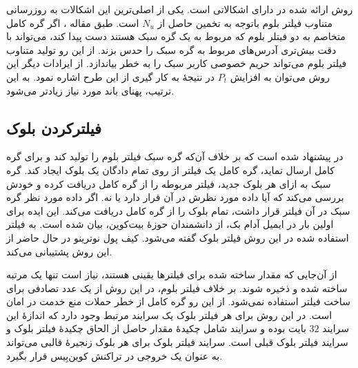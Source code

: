 روش ارائه شده در \cite{Kanemura2017} دارای اشکالاتی است. یکی از اصلی‌ترین این اشکالات به روزرسانی متناوب فیلتر بلوم باتوجه به تخمین حاصل از $N_u$  است. طبق مقاله \cite{Gervais2014}، اگر گره کامل متخاصم به دو فیتلر بلوم که مربوط به یک گره سبک هستند دست پیدا کند، می‌تواند با دقت بیش‌تری آدرس‌های مربوط به گره سبک را حدس بزند. از این رو تولید متناوب فیلتر بلوم می‌تواند حریم خصوصی کاربر سبک را به خطر بیاندازد.
از ایرادات دیگر این روش می‌توان به افزایش $P_t$ در نتیجهٔ به کار گیری از این طرح اشاره نمود. به این ترتیب، پهنای باند مورد نیاز زیادتر می‌شود. 

\subsection{فیلترکردن بلوک}
\label{BIP157}
در \cite{Osuntokun2017} پیشنهاد شده است که بر خلاف آن‌که گره سبک فیلتر بلوم را تولید کند و برای گره کامل ارسال نماید، گره کامل یک فیلتر از روی تمام دادگان یک بلوک ایجاد ‌کند. گره سبک به ازای هر بلوک جدید، فیلتر مربوطه را از گره کامل دریافت کرده و خودش بررسی می‌کند که آیا داده مورد نظرش در آن قرار دارد یا نه. اگر داده مورد نظر گره سبک در آن فیلتر قرار داشت، تمام بلوک را از گره کامل دریافت می‌کند. این ایده برای اولین بار در ایمیل آدام بک، از دانشمندان حوزهٔ بیت‌کوین، بیان شده است\cite{Back2015}. به فیلتر استفاده شده در این روش 
فیلتر بلوک
 گفته می‌شود. کیف پول 
 نوترینو
در حال حاضر از این روش پشتیبانی می‌کند.

از آن‌جایی که مقدار ساخته شده برای فیلتر‌ها یقینی هستند، نیاز است تنها یک مرتبه ساخته شده و ذخیره شوند. بر خلاف فیلتر بلوم، در این روش از یک عدد تصادفی برای ساخت فیلتر استفاده نمی‌شود. از این رو گره کامل از خطر حملات منع خدمت در امان است. در این روش برای هر فیلتر بلوک یک سرایند مرتبط وجود دارد که اندازهٔ این سرایند $32$ بایت بوده و سرایند شامل چکیدهٔ مقدار حاصل از 
الحاق چکیدهٔ فیلتر بلوک و سرایند فیلتر بلوک قبلی است. سرایند فیلتر بلوک برای هر بلوک زنجیرهٔ قالبی می‌تواند به عنوان یک خروجی  در تراکنش کوین‌بِیس قرار بگیرد. 

